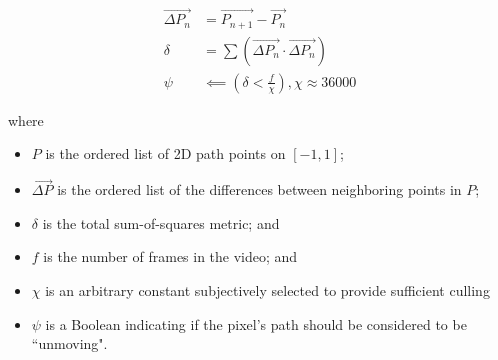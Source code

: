 \begin{align}
    \vec{\Delta P_n}  &= \vec{P_{n+1}} - \vec{P_n} \\
    \delta  &= \sum (\vec{\Delta P_n} \cdotp \vec{\Delta P_n}) \\
    \psi  &\impliedby (\delta < \frac{f}{\chi}), \chi \approx 36000
\end{align}

where
\begin{itemize}
\item $P$ is the ordered list of 2D path points on $[-1,1]$;
\item $\vec{\Delta P}$ is the ordered list of the differences between neighboring points in $P$;
\item $\delta$ is the total sum-of-squares metric; and
\item $f$ is the number of frames in the video; and
\item $\chi$ is an arbitrary constant subjectively selected to provide sufficient culling
\item $\psi$ is a Boolean indicating if the pixel's path should be considered to be ``unmoving".
\end{itemize}
